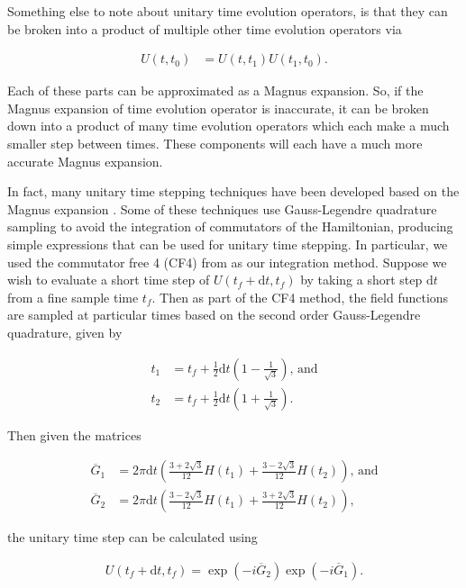 \documentclass{jors}
\begin{document}
			Something else to note about unitary time evolution operators, is that they can be broken into a product of multiple other time evolution operators via

			\begin{align}
				U(t, t_0) &= U(t, t_1)U(t_1, t_0).
			\end{align}

			Each of these parts can be approximated as a Magnus expansion. So, if the Magnus expansion of time evolution operator is inaccurate, it can be broken down into a product of many time evolution operators which each make a much smaller step between times. These components will each have a much more accurate Magnus expansion.

			In fact, many unitary time stepping techniques have been developed based on the Magnus expansion \cite{auer_magnus_2018}. Some of these techniques use Gauss-Legendre quadrature sampling to avoid the integration of commutators of the Hamiltonian, producing simple expressions that can be used for unitary time stepping. In particular, we used the commutator free 4 (CF4) from \cite{auer_magnus_2018} as our integration method. Suppose we wish to evaluate a short time step of \(U(t_f + \mathrm{d}t, t_f)\) by taking a short step \(\mathrm{d}t\) from a fine sample time \(t_f\). Then as part of the CF4 method, the field functions are sampled at particular times based on the second order Gauss-Legendre quadrature, given by
				
			\begin{align}
				t_1 &= t_f + \frac12 \mathrm{d}t\left(1 - \frac{1}{\sqrt{3}}\right)\textrm{, and}\\
				t_2 &= t_f + \frac12 \mathrm{d}t\left(1 + \frac{1}{\sqrt{3}}\right).
			\end{align}
			
			Then given the matrices
			
			\begin{align}
				\overline{G}_1 &= 2\pi\mathrm{d}t\left(\frac{3 + 2\sqrt{3}}{12}H(t_1) + \frac{3 - 2\sqrt{3}}{12}H(t_2)\right)\textrm{, and}\label{eq:cf4_sample_1}\\
				\overline{G}_2 &= 2\pi\mathrm{d}t\left(\frac{3 - 2\sqrt{3}}{12}H(t_1) + \frac{3 + 2\sqrt{3}}{12}H(t_2)\right),\label{eq:cf4_sample_2}
			\end{align}

			the unitary time step can be calculated using

			\begin{align}
				U(t_f + \mathrm{d}t, t_f) = \exp(-i\overline{G}_2)\exp(-i\overline{G}_1).\label{eq:cf4_implementation}
			\end{align}
\end{document}
